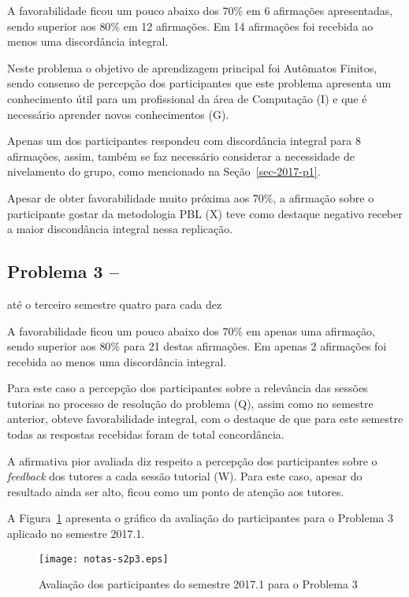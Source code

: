 A favorabilidade ficou um pouco abaixo dos $70\%$ em 6 afirmações apresentadas,
sendo superior aos $80\%$ em 12 afirmações.
Em 14 afirmações foi recebida ao menos uma discordância integral.

Neste problema o objetivo de aprendizagem principal foi
Autômatos Finitos, sendo consenso de percepção dos participantes que
este problema apresenta um conhecimento útil para um profissional
da área de Computação (I) e que é necessário aprender novos
conhecimentos (G).

Apenas um dos participantes respondeu com discordância integral para
8 afirmações, assim, também se faz necessário considerar a
necessidade de nivelamento do grupo, como mencionado
na Seção~\ref{sec-2017-p1}.

Apesar de obter favorabilidade muito próxima aos $70\%$, a afirmação
sobre o participante gostar da metodologia PBL (X) teve como
destaque negativo receber a maior discondância integral nessa
replicação.


\subsection{Problema 3 -- \ProblemaC}
{até o terceiro semestre}{ quatro para cada dez}

A favorabilidade ficou um pouco abaixo dos $70\%$ em apenas uma afirmação,
sendo superior aos $80\%$ para 21 destas afirmações.
Em apenas 2 afirmações foi recebida ao menos uma discordância integral.

Para este caso a percepção dos participantes
sobre a relevância das sessões tutorias no processo
de resolução do problema (Q), assim como no semestre
anterior, obteve favorabilidade integral, com o destaque de
que para este semestre todas as respostas recebidas foram de
total concordância.

A afirmativa pior avaliada diz respeito a percepção dos participantes
sobre o \textit{feedback} dos tutores a cada sessão tutorial (W).
Para este caso, apesar do resultado ainda ser alto, ficou como
um ponto de atenção aos tutores.

A Figura~\ref{aval-s2p3} apresenta o gráfico da
avaliação do participantes para o Problema 3 aplicado no semestre 2017.1.

\begin{figure}[!htb]
\centering
\texttt{[image: notas-s2p3.eps]}
\caption{Avaliação dos participantes do semestre 2017.1 para o Problema 3}
\label{aval-s2p3}
\end{figure}

